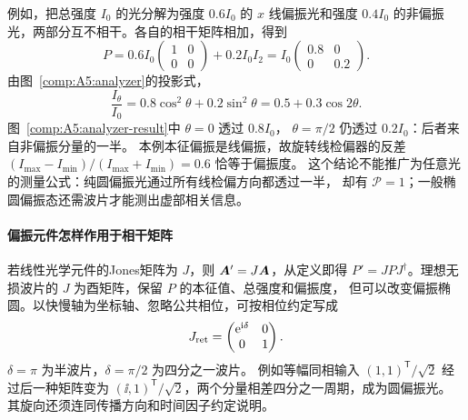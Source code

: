 例如，把总强度 $I_0$ 的光分解为强度 $0.6I_0$ 的 $x$ 线偏振光和强度
$0.4I_0$ 的非偏振光，两部分互不相干。各自的相干矩阵相加，得到
\[
 P=0.6I_0\begin{pmatrix}1&0\\0&0\end{pmatrix}
   +0.2I_0 I_2
 =I_0\begin{pmatrix}0.8&0\\0&0.2\end{pmatrix}.
\]
由图~\ref{comp:A5:analyzer}的投影式，
\[
 \frac{I_\theta}{I_0}=0.8\cos^2\theta+0.2\sin^2\theta
 =0.5+0.3\cos2\theta.
\]
图~\ref{comp:A5:analyzer-result}中 $\theta=0$ 透过 $0.8I_0$，
$\theta=\pi/2$ 仍透过 $0.2I_0$：后者来自非偏振分量的一半。
本例本征偏振是线偏振，故旋转线检偏器的反差
$(I_{\max}-I_{\min})/(I_{\max}+I_{\min})=0.6$ 恰等于偏振度。
这个结论不能推广为任意光的测量公式：纯圆偏振光通过所有线检偏方向都透过一半，
却有 $\mathcal P=1$；一般椭圆偏振态还需波片才能测出虚部相关信息。
\begin{center}\begin{minipage}{.94\linewidth}\centering
{}
\label{comp:A5:analyzer-result}
\end{minipage}\end{center}

\paragraph{偏振元件怎样作用于相干矩阵}
若线性光学元件的Jones矩阵为 $J$，则 $\bm{A}'=J\bm{A}$，从定义即得
$P'=JPJ^\dagger$。理想无损波片的 $J$ 为酉矩阵，保留 $P$ 的本征值、总强度和偏振度，
但可以改变偏振椭圆。以快慢轴为坐标轴、忽略公共相位，可按相位约定写成
\[
 J_{\rm ret}=\begin{pmatrix}\mathrm e^{\mathrm i\delta}&0\\0&1\end{pmatrix}.
\]
$\delta=\pi$ 为半波片，$\delta=\pi/2$ 为四分之一波片。
例如等幅同相输入 $(1,1)^{\mathsf T}/\sqrt2$ 经过后一种矩阵变为
$(\ii,1)^{\mathsf T}/\sqrt2$，两个分量相差四分之一周期，成为圆偏振光。
其旋向还须连同传播方向和时间因子约定说明。
